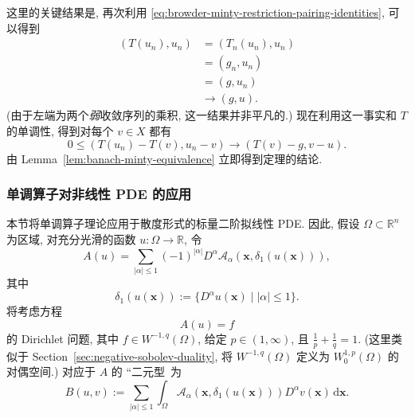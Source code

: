 \begin{Proof}
这里的关键结果是, 再次利用 \eqref{eq:browder-minty-restriction-pairing-identities}, 可以得到
\begin{equation}\label{eq:browder-minty-galerkin-weak-pairing-limit}
\begin{aligned}(T(u_n),u_n)&=(T_n(u_n),u_n)\\&=(g_n,u_n)\\&=(g,u_n)\\&\to(g,u).\end{aligned}
\end{equation}
(由于左端为两个\emph{弱}收敛序列的乘积, 这一结果并非平凡的.) 现在利用这一事实和 $T$ 的单调性, 得到对每个 $v\in X$ 都有
\begin{equation}\label{eq:browder-minty-monotonicity-limit-inequality}
0\leq(T(u_n)-T(v),u_n-v)\to(T(v)-g,v-u).
\end{equation}
由 Lemma~\ref{lem:banach-minty-equivalence} 立即得到定理的结论.
\end{Proof}
\endgroup

\subsubsection{单调算子对非线性 PDE 的应用}\label{subsec:monotone-operators-nonlinear-pde-applications}

本节将单调算子理论应用于散度形式的标量二阶拟线性 PDE. 因此, 假设 $\Omega\subset\mathbb{R}^n$ 为区域, 对充分光滑的函数 $u:\Omega\to\mathbb{R}$, 令
\begin{equation}\label{eq:monotone-quasilinear-divergence-operator}
A(u)=\sum_{|\alpha|\leq1}(-1)^{|\alpha|}D^\alpha\mathcal{A}_\alpha(\bm{x},\delta_1(u(\bm{x}))),
\end{equation}
其中
\begin{equation}\label{eq:monotone-quasilinear-first-derivative-jet}
\delta_1(u(\bm{x})):=\{D^\alpha u(\bm{x})\mid|\alpha|\leq1\}.
\end{equation}
将考虑方程
\begin{equation}\label{eq:monotone-quasilinear-dirichlet-equation}
A(u)=f
\end{equation}
的 Dirichlet 问题, 其中 $f\in W^{-1,q}(\Omega)$, 给定 $p\in(1,\infty)$, 且 $\frac{1}{p}+\frac{1}{q}=1$. (这里类似于 Section~\ref{sec:negative-sobolev-duality}, 将 $W^{-1,q}(\Omega)$ 定义为 $W_0^{1,p}(\Omega)$ 的对偶空间.) 对应于 $A$ 的 ``二元型\textquotesingle\textquotesingle\ 为
\begin{equation}\label{eq:monotone-quasilinear-bivariate-form}
B(u,v):=\sum_{|\alpha|\leq1}\int_\Omega\mathcal{A}_\alpha(\bm{x},\delta_1(u(\bm{x})))D^\alpha v(\bm{x})\,\mathrm{d}\bm{x}.
\end{equation}


